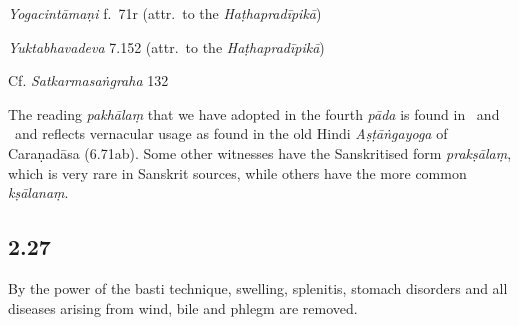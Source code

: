 \begin{ekdosis}
\begin{testimonia}[hp02_026]
\emph{Yogacintāmaṇi} f.~71r (attr.~to the \emph{Haṭhapradīpikā})

\begin{versinnote}
\end{versinnote}

\emph{Yuktabhavadeva} 7.152 (attr.~to the \emph{Haṭhapradīpikā})

\begin{versinnote}
\end{versinnote}

Cf. \emph{Satkarmasaṅgraha} 132

\begin{versinnote}
\end{versinnote}

\end{testimonia}

\begin{philcomm}[hp02_026]
The reading \emph{pakhālaṃ} that we have adopted in the fourth \emph{pāda} is found in \betaOmega \ and \alphaOne \ and reflects vernacular usage as found in the old Hindi \emph{Aṣṭāṅgayoga} of Caraṇadāsa (6.71ab). Some other witnesses have the Sanskritised  form \emph{prakṣālaṃ}, which is very rare in Sanskrit sources, while others have the more common \emph{kṣālanaṃ}.

\end{philcomm}

\subsection*{2.27}
\begin{translation}[hp02_027]
By the power of the basti technique, swelling, splenitis, stomach disorders and all diseases arising from wind, bile and phlegm are removed.
\end{translation}


\end{ekdosis}
